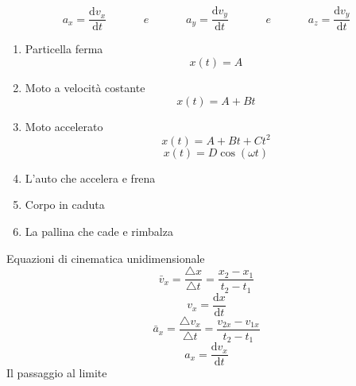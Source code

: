 \documentclass{article}
\newcommand\mathspace{\;\;\;\;\;\;\;\;\;\;\;\; e \;\;\;\;\;\;\;\;\;\;\;\;}
\begin{document}
			\begin{equation}
				a_x = \frac{ \mathrm d v_x }{ \mathrm d t } \mathspace
				a_y = \frac{ \mathrm d v_y }{ \mathrm d t } \mathspace
				a_z = \frac{ \mathrm d v_y }{ \mathrm d t }
			\end{equation}
			\begin{enumerate}
				\item Particella ferma
					\begin{equation} x(t) = A \end{equation}
				\item Moto a velocità costante
					\begin{equation} x(t) = A + B t \end{equation}
				\item Moto accelerato
					\begin{equation} x(t) = A + B t + C t^2 \end{equation}
					\begin{equation} x(t) = D \cos ( \omega t ) \end{equation}
				\item L'auto che accelera e frena
				\item Corpo in caduta
				\item La pallina che cade e rimbalza
			\end{enumerate}
			Equazioni di cinematica unidimensionale
			\begin{equation} \bar v_x = \frac{ \triangle x }{ \triangle t } = \frac{ x_2 - x_1 }{ t_2 - t_1 } \end{equation}
			\begin{equation} v_x = \frac{ \mathrm d x }{ \mathrm d t } \end{equation}
			\begin{equation} \bar a_x = \frac{ \triangle v_x }{ \triangle t } = \frac{ v_{2x} - v_{1x} }{ t_2 - t_1 } \end{equation}
			\begin{equation} a_x = \frac{ \mathrm d v_x }{ \mathrm d t} \end{equation}
			Il passaggio al limite
\end{document}
